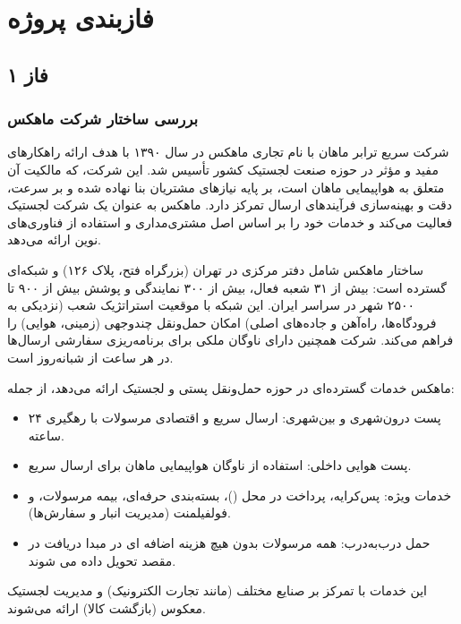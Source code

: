 \documentclass[12pt,a4paper]{report}
\begin{document}
\chapter{فازبندی پروژه}
\section{فاز ۱}
\subsection{بررسی ساختار شرکت ماهکس}
شرکت سریع ترابر ماهان با نام تجاری ماهکس در سال ۱۳۹۰ با هدف ارائه راهکارهای مفید و مؤثر در حوزه صنعت لجستیک کشور تأسیس شد. این شرکت، که مالکیت آن متعلق به هواپیمایی ماهان است، بر پایه نیازهای مشتریان بنا نهاده شده و بر سرعت، دقت و بهینه‌سازی فرآیندهای ارسال تمرکز دارد. ماهکس به عنوان یک شرکت لجستیک فعالیت می‌کند و خدمات خود را بر اساس اصل مشتری‌مداری و استفاده از فناوری‌های نوین ارائه می‌دهد.

ساختار ماهکس شامل دفتر مرکزی در تهران (بزرگراه فتح، پلاک ۱۲۶) و شبکه‌ای گسترده است: بیش از ۳۱ شعبه فعال، بیش از ۳۰۰ نمایندگی  و پوشش بیش از ۹۰۰ تا ۲۵۰۰ شهر در سراسر ایران. این شبکه با موقعیت استراتژیک شعب (نزدیکی به فرودگاه‌ها، راه‌آهن و جاده‌های اصلی) امکان حمل‌ونقل چندوجهی (زمینی، هوایی) را فراهم می‌کند. شرکت همچنین دارای ناوگان ملکی برای برنامه‌ریزی سفارشی ارسال‌ها در هر ساعت از شبانه‌روز است.

ماهکس خدمات گسترده‌ای در حوزه حمل‌ونقل پستی و لجستیک ارائه می‌دهد، از جمله:
\begin{itemize}
	\item پست درون‌شهری و بین‌شهری: ارسال سریع و اقتصادی مرسولات با رهگیری ۲۴ ساعته.
	\item پست هوایی داخلی: استفاده از ناوگان هواپیمایی ماهان برای ارسال سریع.
	\item
خدمات ویژه: پس‌کرایه، پرداخت در محل ()، بسته‌بندی حرفه‌ای، بیمه مرسولات، و فولفیلمنت (مدیریت انبار و سفارش‌ها). 
	\item 
حمل درب‌به‌درب: همه مرسولات بدون هیچ هزینه اضافه ای در مبدا دریافت در مقصد تحویل داده می شوند.
\end{itemize}
این خدمات با تمرکز بر صنایع مختلف (مانند تجارت الکترونیک) و مدیریت لجستیک معکوس (بازگشت کالا) ارائه می‌شوند.
\newpage
\end{document}
